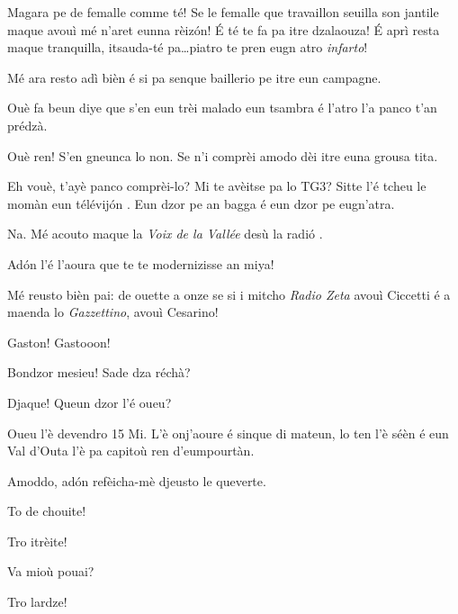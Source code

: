 \begin{drama}
\Casimirspeaks Magara pe de femalle comme té! Se le femalle que travaillon seuilla son jantile maque avouì mé n’aret eunna rèizón! \'E té te fa pa itre dzalaouza! \'E aprì resta maque tranquilla, itsauda-té pa\ldots piatro te pren eugn atro \textit{infarto}!

\Gerominespeaks Mé ara resto adì bièn é si pa senque baillerio pe itre eun campagne.

\Casimirspeaks Ouè fa beun diye que s’en eun trèi malado eun tsambra é l’atro  l’a panco t’an prédzà.

\Gerominespeaks Ouè ren! S’en gneunca lo non. Se n'i comprèi amodo dèi itre euna grousa tita.

\Casimirspeaks Eh vouè, t’ayè panco comprèi-lo? Mi te avèitse pa lo TG3? Sitte l'é tcheu le momàn eun télévij\'on \tv . Eun dzor pe an bagga é eun dzor pe eugn'atra.

\Gerominespeaks Na. Mé acouto maque la \textit{Voix de la Vallée} desù la radi\'o \radio .

\Casimirspeaks Ad\'on l’é l’aoura que te te modernizisse an miya!

\Gerominespeaks Mé reusto bièn pai: de ouette a onze se si i mitcho \textit{Radio Zeta} avouì Ciccetti é a maenda lo \textit{Gazzettino}, avouì Cesarino!


\PersEmpourtantaspeaks Gaston! Gastooon!


\Eunfeurmispeaks Bondzor mesieu! Sade dza réchà?

\PersEmpourtantaspeaks Djaque!  Queun dzor l'é oueu? 

\Eunfeurmispeaks Oueu l'è devendro 15 Mi. L'è onj'aoure é sinque di mateun, lo ten l'è séèn é eun Val d'Outa l'è pa capitoù ren d'eumpourtàn.

\PersEmpourtantaspeaks Amoddo, ad\'on refèicha-mè djeusto le queverte.

\Eunfeurmispeaks To de chouite!


\PersEmpourtantaspeaks Tro itrèite! 

\Eunfeurmispeaks{} Va mioù pouai?

\PersEmpourtantaspeaks Tro lardze!


\end{drama}

